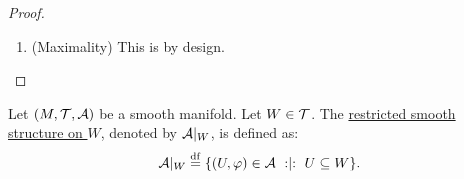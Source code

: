 \documentclass[11pt,reqno]{amsart}
\renewcommand{\phi}{\varphi}
\begin{document}
\begin{proof}
\begin{enumerate}
\begin{enumerate}
\item (One chart in $\mathcal P$ and one chart in $\mathcal Q$)
The transition map is $C^\infty$ by design.

\item (Both charts in $\mathcal Q$)
Let $(W,\chi),\Br{W',\chi'}\in\mathcal Q$.
Let $p\in W\cap W'$. Since $\mathcal P$ covers $M\times N$ as shown
in (1), we can find a chart
$(U\times V,\phi\times\psi)\in\mathcal P$
with $p\in U\times V$.
On the neighborhood $\chi\Br{(U\times V)\cap W\cap W'}$,
we have the following:
\[
\chi'\circ\chi\inv
=\underbrace{\Br{\chi'\circ\Br{\phi\times\psi}\inv}}_{C^\infty}
\circ\underbrace{\Br{\Br{\phi\times\psi}\circ\chi\inv}}_{C^\infty}.
\]
This argument could be repeated for any point $p\in W\cap W'$. So,
$\chi'\circ\chi\inv:\chi\Br{W\cap W'}\to\chi'\Br{W\cap W'}$
is $C^\infty$.
\end{enumerate}

\item (Maximality)
This is by design.
\end{enumerate}
\end{proof}

\begin{Def}
Let $(M,\mathcal{T},\mathcal{A})$ be a smooth manifold.
Let $W\in\mathcal{T}$.
The \ul{restricted smooth structure on $W$},
denoted by $\mathcal{A}|_W$, is defined as:
\[
\A|_W\df\set{(U,\phi)\in\A \st U\subseteq W }.
\]
\end{Def}
\end{document}
